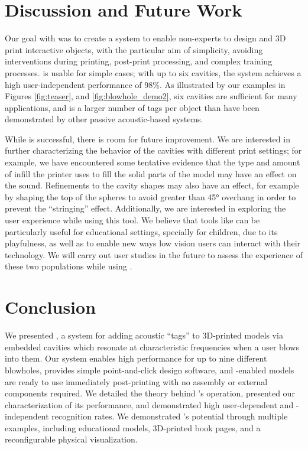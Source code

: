   \section{Discussion and Future Work}
    Our goal with \bh was to create a system to enable non-experts to design and
    3D print interactive objects, with the particular aim of simplicity,
    avoiding interventions during printing, post-print processing, and complex
    training processes. \bh is usable for simple cases; with up to six cavities,
    the system achieves a high user-independent performance of 98\%. As
    illustrated by our examples in Figures \ref{fig:teaser}, and
    \ref{fig:blowhole_demo2}, six cavities are sufficient for many applications,
    and is a larger number of tags per object than have been demonstrated by
    other passive acoustic-based systems\cite{Reyes:2016, Li:2016, Shi:2016,
    Laput:2015, He:2017, Harrison:2012kw}.
    
    While \bh is successful, there is room for future improvement. We are
    interested in further characterizing the behavior of the cavities with
    different print settings; for example, we have encountered some tentative
    evidence that the type and amount of infill the printer uses to fill the
    solid parts of the model may have an effect on the sound. Refinements to the
    cavity shapes may also have an effect, for example by shaping the top of the
    spheres to avoid greater than 45° overhang in order to prevent the
    ``stringing'' effect. Additionally, we are interested in exploring the user
    experience while using this tool. We believe that tools like \bh can be
    particularly useful for educational settings, specially for children, due to
    its playfulness, as well as to enable new ways low vision users can interact
    with their technology. We will carry out user studies in the future to
    assess the experience of these two populations while using \bh.
    
  \section{Conclusion}
    We presented \bh, a system for adding acoustic ``tags'' to 3D-printed models
    via embedded cavities which resonate at characteristic frequencies when a
    user blows into them. Our system enables high performance for up to nine
    different blowholes, provides simple point-and-click design software, and
    \bh-enabled models are ready to use immediately post-printing with no
    assembly or external components required. We detailed the theory behind
    \bh's operation, presented our characterization of its performance, and
    demonstrated high user-dependent and -independent recognition rates. We
    demonstrated \bh's potential through multiple examples, including
    educational models, 3D-printed book pages, and a reconfigurable physical
    visualization. 